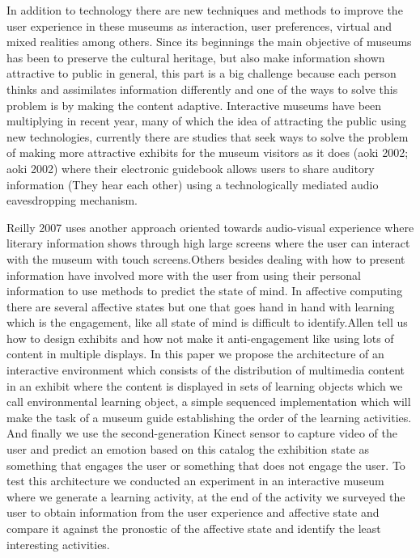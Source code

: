\documentclass[journal]{IEEEtran}
\begin{document}
In addition to technology there are new techniques and methods to improve the user experience in these museums as interaction, user preferences, virtual and mixed realities among others. Since its beginnings the main objective of museums has been to preserve the cultural heritage, but also make information shown attractive to public in general, this part is a big challenge because each person thinks and assimilates information differently and one of the ways to solve this problem is by making the content adaptive.
Interactive museums have been multiplying in recent year, many of which the idea of attracting the public using new technologies, currently there are studies that seek ways to solve the problem of making more attractive exhibits for the museum visitors as it does (aoki 2002; aoki 2002) where their electronic guidebook allows users to share auditory information (They hear each other) using a technologically mediated audio eavesdropping mechanism.

Reilly 2007 uses another approach oriented towards audio-visual experience where literary information shows through high large screens where the user can interact with the museum with touch screens.Others besides dealing with how to present information have involved more with the user from using their personal information to use methods to predict the state of mind. In affective computing there are several affective states but one that goes hand in hand with learning which is the engagement, like all state of mind is difficult to identify.Allen tell us how to design exhibits and how not make it anti-engagement like using lots of content in multiple displays.   
In this paper we propose the architecture of an interactive environment which consists of the distribution of multimedia content in an exhibit where the content is displayed in sets of learning objects which we call environmental learning object, a simple sequenced implementation which will make the task of a museum guide establishing the order of the learning activities. And finally we use the second-generation Kinect sensor to capture video of the user and predict an emotion based on this catalog the exhibition state as something that engages the user or something that does not engage the user. To test this architecture we conducted an experiment in an interactive museum where we generate a learning activity, at the end of the activity we surveyed the user to obtain information from the user experience and affective state and compare it against the pronostic of the affective state and identify the least interesting activities.
\end{document}

